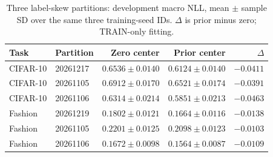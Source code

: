 \begin{table}[!htb]
\centering
\small
\caption{Three label-skew partitions: development macro NLL, mean $\pm$ sample SD over the same three training-seed IDs. $\Delta$ is prior minus zero; TRAIN-only fitting.}
\label{tab:partitiondev}
\setlength{\tabcolsep}{3pt}
\begin{tabular}{llrrr}
\toprule
Task & Partition & Zero center & Prior center & $\Delta$ \\
\midrule
CIFAR-10 & 20261217 & $0.6536\pm0.0140$ & $0.6124\pm0.0140$ & $-0.0411$ \\
CIFAR-10 & 20261105 & $0.6912\pm0.0170$ & $0.6521\pm0.0174$ & $-0.0391$ \\
CIFAR-10 & 20261106 & $0.6314\pm0.0214$ & $0.5851\pm0.0213$ & $-0.0463$ \\
Fashion & 20261219 & $0.1802\pm0.0121$ & $0.1664\pm0.0116$ & $-0.0138$ \\
Fashion & 20261105 & $0.2201\pm0.0125$ & $0.2098\pm0.0123$ & $-0.0103$ \\
Fashion & 20261106 & $0.1672\pm0.0098$ & $0.1564\pm0.0087$ & $-0.0109$ \\
\bottomrule
\end{tabular}
\end{table}
